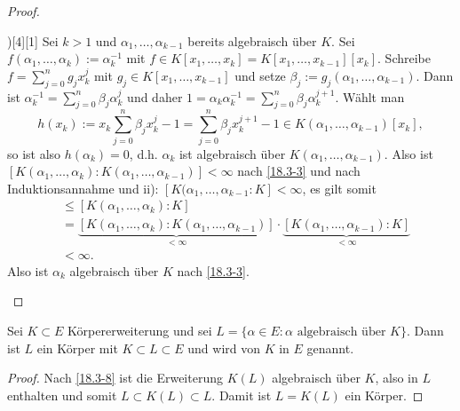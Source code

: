 \begin{kor}
\begin{proof}
\begin{seg}{\ProofImplication)[4][1]}
			Sei $k > 1$ und $\alpha_1, \dotsc, \alpha_{k-1}$ bereits algebraisch über $K$.
			Sei $f(\alpha_1, \dotsc, \alpha_k) := \alpha_k^{-1}$ mit $f \in K[x_1, \dotsc, x_k] = K[x_1, \dotsc, x_{k-1}][x_k]$.
			Schreibe $f = \sum_{j=0}^n g_j x_k^j$ mit $g_j \in K[x_1, \dotsc, x_{k-1}]$ und setze $\beta_j := g_j(\alpha_1, \dotsc, \alpha_{k-1})$.
			Dann ist $\alpha_k^{-1} = \sum_{j=0}^n \beta_j \alpha_k^j$ und daher $1 = \alpha_k \alpha_k^{-1} = \sum_{j=0}^n \beta_j \alpha_k^{j+1}$.
			Wählt man
			\[
				h(x_k) := x_k \sum_{j=0}^n \beta_j x_k^j - 1 = \sum_{j=0}^n \beta_j x_k^{j+1} - 1
				\in K(\alpha_1, \dotsc, \alpha_{k-1})[x_k],
			\]
			so ist also $h(\alpha_k) = 0$, d.h. $\alpha_k$ ist algebraisch über $K(\alpha_1, \dotsc, \alpha_{k-1})$.
			Also ist $[K(\alpha_1, \dotsc, \alpha_k) : K(\alpha_1, \dotsc, \alpha_{k-1}) ] < \infty$ nach \ref{18.3-3} und nach Induktionsannahme und ii): $[K(\alpha_1, \dotsc, \alpha_{k-1} : K] < \infty$, es gilt somit
			\begin{align*}
				[K(\alpha_k) : K]
				&\le [K(\alpha_1, \dotsc, \alpha_k) : K] \\
				&= \underbrace{[K(\alpha_1, \dotsc, \alpha_k) : K(\alpha_1, \dotsc, \alpha_{k-1})]}_{<\infty} \cdot \underbrace{[ K(\alpha_1, \dotsc, \alpha_{k-1}) : K]}_{<\infty} \\
				&< \infty.
			\end{align*}
			Also ist $\alpha_k$ algebraisch über $K$ nach \ref{18.3-3}.
		\end{seg}
	\end{proof}
\end{kor}

\begin{kor} \label{18.3-11}
	Sei $K \subset E$ Körpererweiterung und sei \(L = \{ \alpha \in E : \text{$\alpha$ algebraisch über $K$}\}\).
	Dann ist $L$ ein Körper mit $K \subset L \subset E$ und wird  von $K$ in $E$ genannt.
	\begin{proof}
		Nach \ref{18.3-8} ist die Erweiterung $K(L)$ algebraisch über $K$, also in $L$ enthalten und somit $L \subset K(L) \subset L$.
		Damit ist $L = K(L)$ ein Körper.
	\end{proof}
\end{kor}

